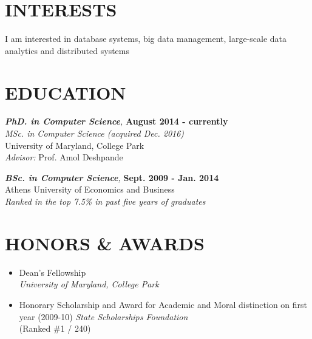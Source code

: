 \documentclass[margin, 10pt]{res} %
\begin{document}
\begin{resume}


\section{INTERESTS}

I am interested in database systems, big data management, large-scale data analytics and distributed systems


\section{EDUCATION}

{\sl \textbf{PhD. in Computer Science},}  \hfill \textbf{August 2014 - currently} \\
\textit{MSc. in Computer Science (acquired Dec. 2016)} \\
University of Maryland, College Park\\
\textit{Advisor:} Prof. Amol Deshpande

{\sl \textbf{BSc. in Computer Science},}  \hfill \textbf{Sept. 2009 - Jan. 2014} \\
Athens University of Economics and Business\\
\textit{Ranked in the top 7.5\% in past five years of graduates}



\section{HONORS \& AWARDS}

\begin{itemize}
  \item Dean's Fellowship \\
  \textit{University of Maryland, College Park}
  \item Honorary Scholarship and Award for Academic and Moral distinction on first year (2009-10)
 \textit{State Scholarships Foundation}\\
 (Ranked \#1 / 240)
\end{itemize}


\end{resume}
\end{document}
